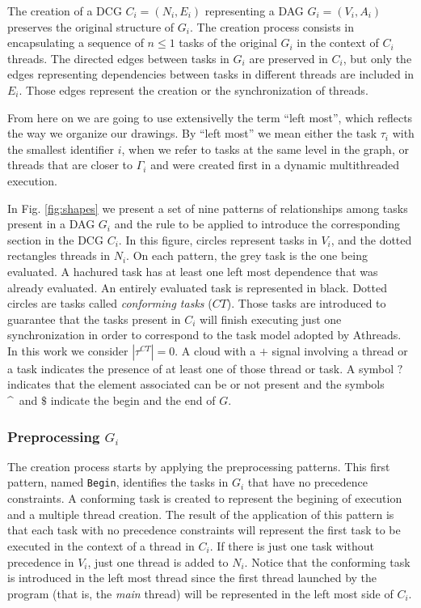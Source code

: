 \documentclass[twocolumn]{svjour3}
\begin{document}
The creation of a DCG $C_i = (N_i,E_i)$ representing a DAG $G_i = (V_i,A_i)$ preserves the original structure of $G_i$. The creation process consists in encapsulating a sequence of $n \le 1$ tasks of the original $G_i$ in the context of $C_i$ threads. The directed edges between tasks in $G_i$ are preserved in $C_i$, but only the edges representing dependencies between tasks in different threads are included in $E_i$. Those edges represent the creation or the synchronization of threads.

From here on we are going to use extensivelly the term ``left most'', which reflects the way we organize our drawings. By ``left most'' we mean either the task $\tau_i$ with the smallest identifier $i$, when we refer to tasks at the same level in the graph, or threads that are closer to $\Gamma_i$ and were created first in a dynamic multithreaded execution.

In Fig. \ref{fig:shapes} we present a set of nine patterns of relationships among tasks present in a DAG $G_i$ and the rule to be applied to introduce the corresponding section in the DCG $C_i$. In this figure, circles represent tasks in $V_i$, and the dotted rectangles threads in $N_i$. On each pattern, the grey task is the one being evaluated. A hachured task has at least one left most dependence that was already evaluated. An entirely evaluated task is represented in black. Dotted circles are tasks called {\em conforming tasks} ($CT$). Those tasks are introduced to guarantee that the tasks present in $C_i$ will finish executing just one synchronization in order to correspond to the task model adopted by Athreads. In this work we consider $ |\tau^{CT}| = 0 $. A cloud with a $+$ signal involving a thread or a task indicates the presence of at least one of those thread or task.
A symbol $?$ indicates that the element associated can be or not present and the symbols \^~and $\$$ indicate the begin and the end of $G$.

\subsubsection{Preprocessing $G_i$}

The creation process starts by applying the preprocessing patterns. This first pattern, named \verb+Begin+, identifies the tasks in $G_i$ that have no precedence constraints. A conforming task is created to represent the begining of execution and a multiple thread creation. The result of the application of this pattern is that each task with no precedence constraints will represent the first task to be executed in the context of a thread in $C_i$. If there is just one task without precedence in $V_i$, just one thread is added to $N_i$. Notice that the conforming task is introduced in the left most thread since the first thread launched by the program (that is, the {\em main} thread) will be represented in the left most side of $C_i$.
\end{document}
